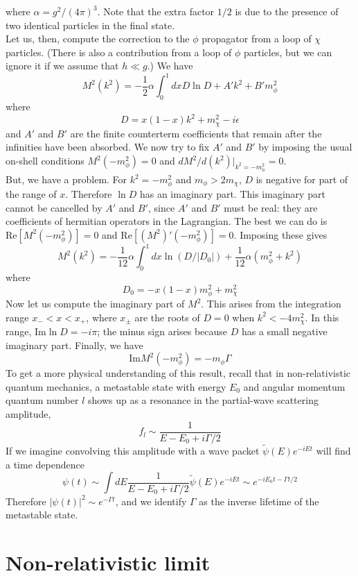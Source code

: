 where $\alpha = g^2/(4\pi)^3$.
Note that the extra factor $1/2$ is due to the presence of two identical particles in the final state.
\\
Let us, then, compute the correction to the $\phi$ propagator from a loop of $\chi$ particles. (There is also a contribution from a loop of $\phi$ particles, but we can ignore it if we assume that $h \ll g$.) We have
\[M^2(k^2) = -\frac{1}{2}\alpha \int_0^1 dx D\ln D + A'k^2 + B'm_{\phi}^2\]
where
\[D = x(1-x)k^2 + m_{\chi}^2 - i\epsilon\]
and $A'$ and $B'$ are the finite counterterm coefficients that remain after the infinities have been absorbed. 
We now try to fix $A'$ and $B'$ by imposing the usual on-shell conditions $M^2(-m_{\phi}^2) = 0$ and $d M^2 / d(k^2)|_{k^2=-m_{\phi}^2} = 0$.
\\
But, we have a problem. For $k^2 = -m_{\phi}^2$ and $m_{\phi} > 2m_{\chi}$, $D$ is negative for part of the range of $x$. Therefore $\ln D$ has an imaginary part. 
This imaginary part cannot be cancelled by $A'$ and $B'$, since $A'$ and $B'$ must be real: they are coefficients of hermitian operators in the Lagrangian. 
The best we can do is $\mathrm{Re}[M^2(-m_{\phi}^2)] = 0$ and $\mathrm{Re}[(M^2)'(-m_{\phi}^2)] = 0$. Imposing these gives
\[M^2(k^2) = -\frac{1}{12}\alpha \int_0^1 dx \ln(D/|D_0|) + \frac{1}{12}\alpha(m_{\phi}^2 + k^2)\]
where
\[D_0 = -x(1-x)m_{\phi}^2 + m_{\chi}^2\]
Now let us compute the imaginary part of $M^2$. 
This arises from the integration range $x_- < x < x_+$, where $x_{\pm}$ are the roots of $D = 0$ when $k^2 < -4m_{\chi}^2$. 
In this range, $\mathrm{Im} \ln D = -i \pi$; the minus sign
arises because $D$ has a small negative imaginary part. Finally, we have
\[\mathrm{Im} M^2(-m_{\phi}^2) = -m_{\phi} \Gamma\]
To get a more physical understanding of this result, recall that in non-relativistic quantum mechanics, a metastable state with energy $E_0$ and angular momentum quantum number $l$ shows up as a resonance in the partial-wave scattering amplitude,
\[f_l \sim \frac{1}{E - E_0 + i\Gamma/2}\]
If we imagine convolving this amplitude with a wave packet $\tilde{\psi}(E)e^{-iEt}$ will find a time dependence
\[\psi(t) \sim \int dE \frac{1}{E-E_0+i\Gamma/2} \tilde{\psi}(E)e^{-iEt} \sim e^{-iE_0 t - \Gamma t /2}\]
Therefore $|\psi(t)|^2 \sim e^{-\Gamma t}$, and we identify $\Gamma$ as the inverse lifetime of the metastable state.

\section{Non-relativistic limit}
